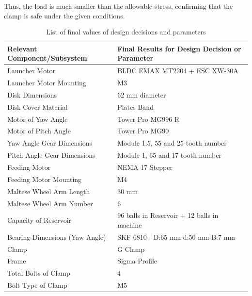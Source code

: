 \documentclass[12pt]{report}
\begin{document}
Thus, the load is much smaller than the allowable stress, confirming that the clamp is safe under the given conditions.

\begin{table}[h!]
\centering
\caption{List of final values of design decisions and parameters}
\scriptsize
\begin{tabular}{|l|l|}
\hline
\textbf{Relevant Component/Subsystem}       & \textbf{Final Results for Design Decision or Parameter} \\ \hline
Launcher Motor                              & BLDC EMAX MT2204 + ESC XW-30A                           \\ \hline
Launcher Motor Mounting                     & M3                                                     \\ \hline
Disk Dimensions                             & 62 mm diameter                                         \\ \hline
Disk Cover Material                         & Plates Band                                            \\ \hline
Motor of Yaw Angle                          & Tower Pro MG996 R                                      \\ \hline
Motor of Pitch Angle                        & Tower Pro MG90                                         \\ \hline
Yaw Angle Gear Dimensions                   & Module 1.5, 55 and 25 tooth number                     \\ \hline
Pitch Angle Gear Dimensions                 & Module 1, 65 and 17 tooth number                       \\ \hline
Feeding Motor                               & NEMA 17 Stepper                                       \\ \hline
Feeding Motor Mounting                      & M4                                                     \\ \hline
Maltese Wheel Arm Length                    & 30 mm                                                  \\ \hline
Maltese Wheel Arm Number                    & 6                                                      \\ \hline
Capacity of Reservoir                       & 96 balls in Reservoir + 12 balls in machine            \\ \hline
Bearing Dimensions (Yaw Angle)             & SKF 6810 - D:65 mm d:50 mm B:7 mm                      \\ \hline
Clamp                                       & G Clamp                                                \\ \hline
Frame                                       & Sigma Profile                                          \\ \hline
Total Bolts of Clamp                        & 4                                                      \\ \hline
Bolt Type of Clamp                          & M5                                                     \\ \hline
\end{tabular}
\end{table}
\end{document}
